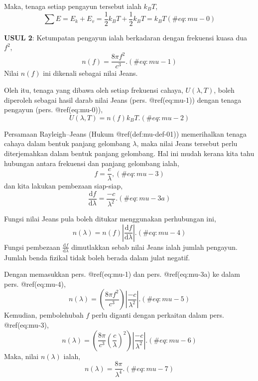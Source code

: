 \documentclass[
]{book}
\begin{document}
Maka, tenaga setiap pengayun tersebut ialah \(k_BT\), \begin{equation}
\sum E = E_k + E_v = \frac{1}{2}{k_BT} + \frac{1}{2}{k_BT} =k_BT (\#eq:mu-0)
\end{equation}

\textbf{USUL 2}: Ketumpatan pengayun ialah berkadaran dengan frekuensi
kuasa dua \(f^2\), \begin{equation}
n(f) = \frac{8\pi f^2}{c^3}.(\#eq:mu-1)
\end{equation} Nilai \(n(f)\) ini dikenali sebagai nilai Jeans.

Oleh itu, tenaga yang dibawa oleh setiap frekuensi cahaya,
\(U\left(\lambda,T\right)\), boleh diperoleh sebagai hasil darab nilai
Jeans (pers. @ref(eq:mu-1)) dengan tenaga pengayun (pers.
@ref(eq:mu-0)), \begin{equation}
U\left(\lambda,T\right) = n\left(f\right)k_BT.
(\#eq:mu-2)
\end{equation}

Persamaan Rayleigh--Jeans (Hukum @ref(def:mu-def-01)) memerihalkan
tenaga cahaya dalam bentuk panjang gelombang \(\lambda\), maka nilai
Jeans tersebut perlu diterjemahkan dalam bentuk panjang gelombang. Hal
ini mudah kerana kita tahu hubungan antara frekuensi dan panjang
gelombang ialah, \begin{equation}
f = \frac{c}{\lambda},(\#eq:mu-3)
\end{equation} dan kita lakukan pembezaan siap-siap, \begin{equation}
\frac{\text{d}f}{\text{d}\lambda} = \frac{-c}{\lambda^2}.
(\#eq:mu-3a)
\end{equation}

Fungsi nilai Jeans pula boleh ditukar menggunakan perhubungan ini,
\begin{equation}
n\left(\lambda\right) = n(f)\left|\frac{\text{d}{f}}{\text{d}{\lambda}}\right|.
(\#eq:mu-4)
\end{equation} Fungsi pembezaan
\(\frac{\text{d}{f}}{\text{d}{\lambda}}\) dimutlakkan sebab nilai Jeans
ialah jumlah pengayun. Jumlah benda fizikal tidak boleh berada dalam
julat negatif.

Dengan memasukkan pers. @ref(eq:mu-1) dan pers. @ref(eq:mu-3a) ke dalam
pers. @ref(eq:mu-4), \begin{equation}
n(\lambda) = \left(\frac{8\pi f^2}{c^3}\right)\left|\frac{-c}{\lambda^2}\right|.
  (\#eq:mu-5)
\end{equation} Kemudian, pembolehubah \(f\) perlu diganti dengan
perkaitan dalam pers. @ref(eq:mu-3), \begin{equation}
n(\lambda) = \left(\frac{8\pi}{c^3}\left(\frac{c}{\lambda}\right)^2\right)\left|\frac{-c}{\lambda^2}\right|.
  (\#eq:mu-6)
\end{equation} Maka, nilai \(n(\lambda)\) ialah, \begin{equation}
n\left(\lambda\right) = \frac{8\pi}{\lambda^4}.
(\#eq:mu-7)
\end{equation}
\end{document}
